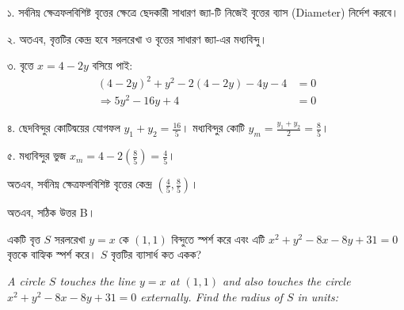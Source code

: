 \documentclass[12pt, a4paper]{article}
\begin{document}
\begin{tcolorbox}[solutionbox={সমাধান (Solution)}]
    \noindent
    ১. সর্বনিম্ন ক্ষেত্রফলবিশিষ্ট বৃত্তের ক্ষেত্রে ছেদকারী সাধারণ জ্যা-টি নিজেই বৃত্তের ব্যাস (Diameter) নির্দেশ করবে।
    
    \vspace{0.5em}
    ২. অতএব, বৃত্তটির কেন্দ্র হবে সরলরেখা ও বৃত্তের সাধারণ জ্যা-এর মধ্যবিন্দু।
    
    \vspace{0.5em}
    ৩. বৃত্তে $x = 4 - 2y$ বসিয়ে পাই:
    \begin{align*}
        (4 - 2y)^2 + y^2 - 2(4 - 2y) - 4y - 4 &= 0 \\
        \Rightarrow 5y^2 - 16y + 4 &= 0
    \end{align*}
    
    \vspace{0.5em}
    ৪. ছেদবিন্দুর কোটিদ্বয়ের যোগফল $y_1 + y_2 = \frac{16}{5}$। মধ্যবিন্দুর কোটি $y_m = \frac{y_1 + y_2}{2} = \frac{8}{5}$।
    
    \vspace{0.5em}
    ৫. মধ্যবিন্দুর ভুজ $x_m = 4 - 2\left(\frac{8}{5}\right) = \frac{4}{5}$। 
    
    \vspace{0.5em}
    অতএব, সর্বনিম্ন ক্ষেত্রফলবিশিষ্ট বৃত্তের কেন্দ্র $\left(\frac{4}{5}, \frac{8}{5}\right)$।
    
    \vspace{0.5em}
    অতএব, সঠিক উত্তর B।
\end{tcolorbox}
\begin{tcolorbox}[questionbox={প্রশ্ন (Question) 10}]
    \noindent
    একটি বৃত্ত $S$ সরলরেখা $y = x$ কে $(1, 1)$ বিন্দুতে স্পর্শ করে এবং এটি $x^2 + y^2 - 8x - 8y + 31 = 0$ বৃত্তকে বাহ্যিক স্পর্শ করে। $S$ বৃত্তটির ব্যাসার্ধ কত একক?
    
    \vspace{0.8em}
    \begin{english}
    \noindent\textit{\color{darkgray}
    A circle $S$ touches the line $y = x$ at $(1, 1)$ and also touches the circle $x^2 + y^2 - 8x - 8y + 31 = 0$ externally. Find the radius of $S$ in units:
    }
    \end{english}
\end{tcolorbox}
\end{document}
